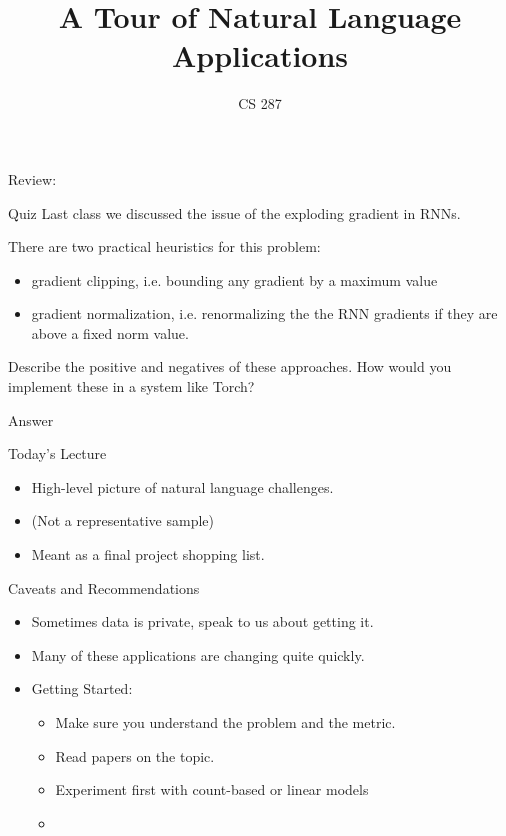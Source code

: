 \documentclass{beamer}
\title{A Tour of Natural Language Applications}
\date{}
\author{CS 287 }
\begin{document}
\begin{frame}
  \titlepage
\end{frame}


\begin{frame}{Review:}
  
\end{frame}

\begin{frame}{Quiz}
  Last class we discussed the issue of 
  the exploding gradient in RNNs. 
  
  There are two practical heuristics  
  for this problem:
  \begin{itemize}
  \item gradient clipping, i.e. bounding any gradient
    by a maximum value 
  \item gradient normalization, i.e. renormalizing the 
    the RNN gradients if they are above a fixed norm 
    value.
  \end{itemize}

  \air 

  Describe the positive and negatives of these approaches.
  How would you implement these in a system like Torch?  
\end{frame}

\begin{frame}{Answer}
  
\end{frame}

\begin{frame}{Today's Lecture}
  \begin{itemize}
  \item High-level picture of natural language challenges.
    \air

  \item (Not a representative sample)
    
    \air

  \item Meant as a final project shopping list.
  \end{itemize}
\end{frame}

\begin{frame}{Caveats and Recommendations}
  \begin{itemize}
  \item Sometimes data is private, speak to us about getting it. 
    \air

  \item Many of these applications are changing quite quickly.
    \air 
    
  \item Getting Started: 
    \begin{itemize}
    \item Make sure you understand the problem and the metric.
      \air
    \item Read papers on the topic.
      \air
    \item Experiment first with count-based or linear models
      \air 
    \item 
    \end{itemize}
  \end{itemize}
\end{frame}
\end{document}
